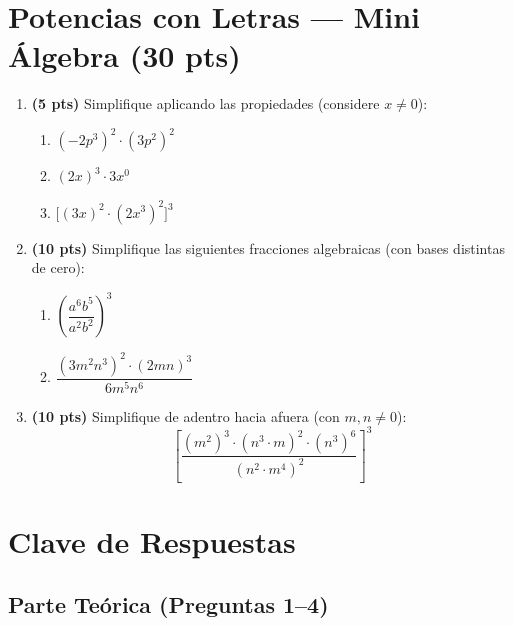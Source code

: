 \documentclass[12pt, letterpaper]{article}
\begin{document}
\newpage

\section{Potencias con Letras — Mini Álgebra (30 pts)}

\begin{enumerate}[leftmargin=*]

  \item \textbf{(5 pts)} Simplifique aplicando las propiedades (considere $x \neq 0$):
        \begin{enumerate}[label=\alph*)]
          \item $(-2p^{3})^{2} \cdot (3p^{2})^{2}$
          \item $(2x)^{3} \cdot 3x^{0}$
          \item $\big[(3x)^{2} \cdot (2x^{3})^{2}\big]^{3}$
        \end{enumerate}

  \item \textbf{(10 pts)} Simplifique las siguientes fracciones algebraicas (con bases distintas de cero):
        \begin{enumerate}[label=\alph*)]
          \item $\left(\dfrac{a^{6}b^{5}}{a^{2}b^{2}}\right)^{3}$
          \item $\dfrac{(3m^{2}n^{3})^{2} \cdot (2mn)^{3}}{6m^{5}n^{6}}$
        \end{enumerate}

  \item \textbf{(10 pts)} Simplifique de adentro hacia afuera (con $m, n \neq 0$):
        \[
          \left[\frac{(m^{2})^{3} \cdot (n^{3} \cdot m)^{2} \cdot (n^{3})^{6}}{(n^{2} \cdot m^{4})^{2}}\right]^{3}
        \]
\end{enumerate}

\newpage

\newpage

\ifmwclaves
  \section{Clave de Respuestas}

  \subsection*{Parte Teórica (Preguntas 1--4)}
\end{document}
